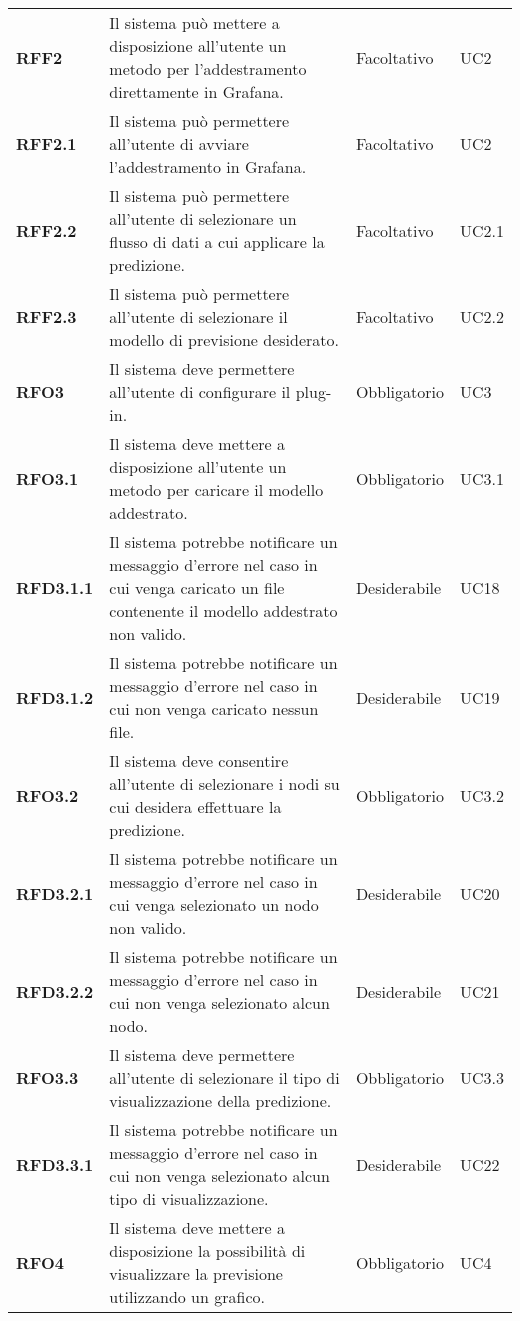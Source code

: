 \begin{longtable}[H]{>{\centering\bfseries}m{2cm} >{\centering}m{9cm} >{\centering}m{2.5cm} >{\centering\arraybackslash}m{2.5cm}}
  \textbf{RFF2} & Il sistema può mettere a disposizione all'utente un metodo per l’addestramento direttamente in Grafana. & Facoltativo & UC2 \\
  \textbf{RFF2.1} & Il sistema può permettere all’utente di avviare l’addestramento in Grafana. & Facoltativo & UC2 \\
  \textbf{RFF2.2} & Il sistema può permettere all'utente di selezionare un flusso di dati a cui applicare la predizione. & Facoltativo & UC2.1 \\
  \textbf{RFF2.3} & Il sistema può permettere all’utente di selezionare il modello di previsione desiderato. & Facoltativo & UC2.2 \\
  \textbf{RFO3} & Il sistema deve permettere all’utente di configurare il plug-in. & Obbligatorio & UC3 \\
  \textbf{RFO3.1} & Il sistema deve mettere a disposizione all’utente un metodo per caricare il modello addestrato. & Obbligatorio & UC3.1 \\
  \textbf{RFD3.1.1} & Il sistema potrebbe notificare un messaggio d'errore nel caso in cui venga caricato un file contenente il modello addestrato non valido. & Desiderabile & UC18 \\
  \textbf{RFD3.1.2} & Il sistema potrebbe notificare un messaggio d'errore nel caso in cui non venga caricato nessun file. & Desiderabile & UC19 \\
  \textbf{RFO3.2} & Il sistema deve consentire all’utente di selezionare i nodi su cui desidera effettuare la predizione. & Obbligatorio & UC3.2 \\
  \textbf{RFD3.2.1} & Il sistema potrebbe notificare un messaggio d'errore nel caso in cui venga selezionato un nodo non valido. & Desiderabile & UC20 \\
  \textbf{RFD3.2.2} & Il sistema potrebbe notificare un messaggio d'errore nel caso in cui non venga selezionato alcun nodo. & Desiderabile & UC21 \\
  \textbf{RFO3.3} & Il sistema deve permettere all’utente di selezionare il tipo di visualizzazione della predizione. & Obbligatorio & UC3.3 \\
  \textbf{RFD3.3.1} & Il sistema potrebbe notificare un messaggio d'errore nel caso in cui non venga selezionato alcun tipo di visualizzazione. & Desiderabile & UC22 \\
  \textbf{RFO4} & Il sistema deve mettere a disposizione la possibilità di visualizzare la previsione utilizzando un grafico. & Obbligatorio & UC4 \\

\end{longtable}
